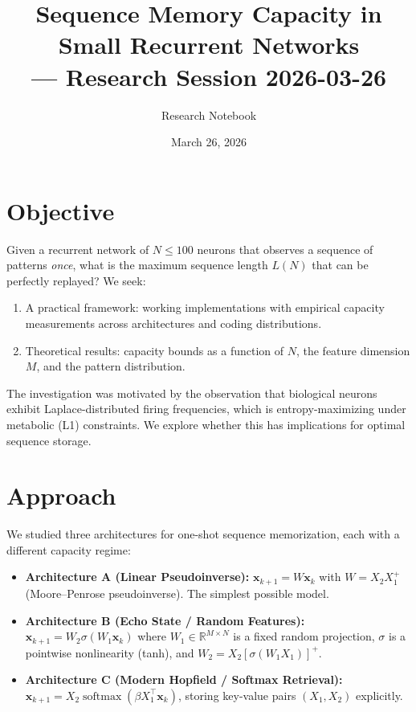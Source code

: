 \documentclass[11pt]{article}
\title{Sequence Memory Capacity in Small Recurrent Networks\\--- Research Session 2026-03-26}
\author{Research Notebook}
\date{March 26, 2026}
\theoremstyle{definition}
\theoremstyle{remark}
\begin{document}
\maketitle

\section{Objective}

Given a recurrent network of $N \leq 100$ neurons that observes a sequence of patterns \emph{once}, what is the maximum sequence length $L(N)$ that can be perfectly replayed? We seek:
\begin{enumerate}
    \item A practical framework: working implementations with empirical capacity measurements across architectures and coding distributions.
    \item Theoretical results: capacity bounds as a function of $N$, the feature dimension $M$, and the pattern distribution.
\end{enumerate}

The investigation was motivated by the observation that biological neurons exhibit Laplace-distributed firing frequencies, which is entropy-maximizing under metabolic (L1) constraints. We explore whether this has implications for optimal sequence storage.

\section{Approach}

We studied three architectures for one-shot sequence memorization, each with a different capacity regime:

\begin{itemize}
    \item \textbf{Architecture A (Linear Pseudoinverse):} $\mathbf{x}_{k+1} = W\mathbf{x}_k$ with $W = X_2 X_1^+$ (Moore--Penrose pseudoinverse). The simplest possible model.
    \item \textbf{Architecture B (Echo State / Random Features):} $\mathbf{x}_{k+1} = W_2 \sigma(W_1 \mathbf{x}_k)$ where $W_1 \in \mathbb{R}^{M \times N}$ is a fixed random projection, $\sigma$ is a pointwise nonlinearity (tanh), and $W_2 = X_2 [\sigma(W_1 X_1)]^+$.
    \item \textbf{Architecture C (Modern Hopfield / Softmax Retrieval):} $\mathbf{x}_{k+1} = X_2 \operatorname{softmax}(\beta X_1^\top \mathbf{x}_k)$, storing key-value pairs $(X_1, X_2)$ explicitly.
\end{itemize}
\end{document}
